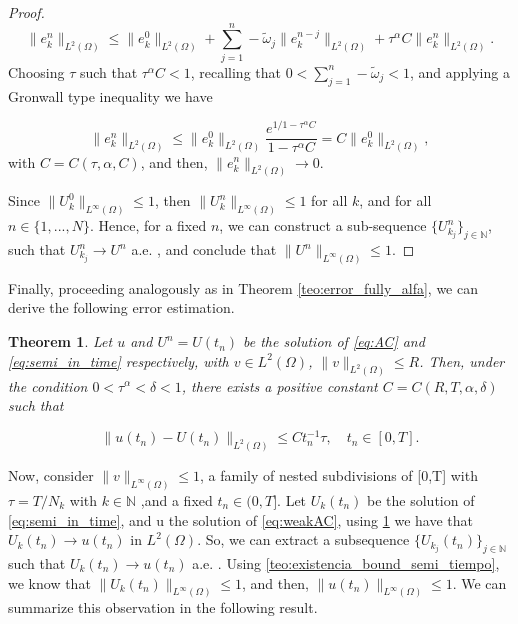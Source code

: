 \documentclass{amsart}
\newcommand{\ele}{L^2(\Omega)}
\newcommand{\w}{\omega}
\newcommand{\W}{\Omega}
\newcommand{\wtilde}{\tilde{\w}}
\def\N{{\mathbb {N}}}
\newtheorem{theorem}{Theorem}[section]
\theoremstyle{remark}
\theoremstyle{definition}
\numberwithin{equation}{section}
\begin{document}
\begin{proof}
\begin{equation} 
      \| e^n_k \|_{\ele}  \leq  \|e^{0}_k\|_{\ele} +  \sum^n_{j=1}-\wtilde_j \| e^{n-j}_k\|_{\ele} +  \tau^{\alpha} C \| e^n_k \|_{\ele}
\label{eq:semi_time_ex7}.
\end{equation}
Choosing $\tau$ such that $\tau^{\alpha}C<1$, recalling that $0 < \sum^n_{j=1} -\wtilde_j < 1$, and applying a Gronwall type inequality we have

$$\| e^n_k \|_{\ele} \leq \|e^{0}_k\|_{\ele} \frac{e^{1/1 - \tau^{\alpha}C}}{1 - \tau^{\alpha}C} = C\|e^{0}_k\|_{\ele}, $$
with $C=C(\tau,\alpha,C)$, and then, $\| e^n_k \|_{\ele} \to 0$.   

 Since $\| U^0_k \|_{L^{\infty}(\W)} \leq 1$, then $\| U^n_k \|_{L^{\infty}(\W)} \leq 1$ for all $k$, and for all $n \in \{1,...,N\}$. Hence, for a fixed $n$, we can construct a sub-sequence $\{U^n_{k_j}\}_{j\in \N}$, such that $U^n_{k_j} \to U^n$ a.e. , and conclude that $\|U^n\|_{L^{\infty}(\W)} \leq 1$.      \end{proof}

Finally, proceeding analogously as in Theorem \ref{teo:error_fully_alfa}, we can derive the following error estimation. 

\begin{theorem}
\label{teo:error_semi_tiempo}
Let $u$ and $U^n = U(t_n)$ be the solution of \eqref{eq:AC} and \eqref{eq:semi_in_time} respectively, with $v \in L^2(\Omega)$, $\|v\|_{L^2(\Omega)}\leq R$. Then, under the condition $0<\tau^{\alpha}<\delta<1$, there exists a positive constant $C=C( R , T , \alpha , \delta)$ such that   

\begin{equation}
\|u(t_n) - U(t_n)\|_{L^2(\Omega)} \leq C t_n^{ - 1}\tau, \quad t_n\in [0,T]. 
\label{eq:error_semi_tiempo}
\end{equation}
\end{theorem}

Now, consider $\|v\|_{L^{\infty}(\W)} \leq 1$, a family of nested subdivisions of [0,T] with $\tau = T/N_k$ with $k \in \N$ ,and a fixed $t_n \in (0,T]$. Let $U_k(t_n)$ be the solution of \eqref{eq:semi_in_time}, and u the solution of \eqref{eq:weakAC}, using \ref{teo:error_semi_tiempo} we have that $U_k(t_n) \to u(t_n)$ in $\ele$. So, we can extract a subsequence $\{U_{k_j}(t_n)\}_{j \in \N}$ such that $U_k(t_n) \to u(t_n)$ a.e. . Using \ref{teo:existencia_bound_semi_tiempo}, we know that $\|U_k(t_n) \|_{L^{\infty}(\W)} \leq 1$, and then, $\|u(t_n) \|_{L^{\infty}(\W)} \leq 1$. We can summarize this observation in the following result.
\end{document}
